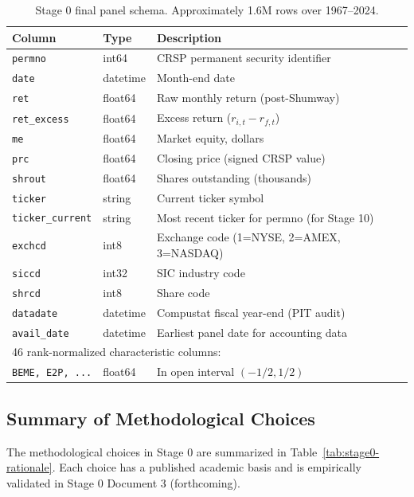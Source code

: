\begin{table}[!ht]
\centering
\small
\begin{tabular}{lll}
\toprule
\textbf{Column} & \textbf{Type} & \textbf{Description} \\
\midrule
\texttt{permno} & int64 & CRSP permanent security identifier \\
\texttt{date} & datetime & Month-end date \\
\texttt{ret} & float64 & Raw monthly return (post-Shumway) \\
\texttt{ret\_excess} & float64 & Excess return ($r_{i,t} - r_{f,t}$) \\
\texttt{me} & float64 & Market equity, dollars \\
\texttt{prc} & float64 & Closing price (signed CRSP value) \\
\texttt{shrout} & float64 & Shares outstanding (thousands) \\
\texttt{ticker} & string & Current ticker symbol \\
\texttt{ticker\_current} & string & Most recent ticker for permno (for Stage 10) \\
\texttt{exchcd} & int8 & Exchange code (1=NYSE, 2=AMEX, 3=NASDAQ) \\
\texttt{siccd} & int32 & SIC industry code \\
\texttt{shrcd} & int8 & Share code \\
\texttt{datadate} & datetime & Compustat fiscal year-end (PIT audit) \\
\texttt{avail\_date} & datetime & Earliest panel date for accounting data \\
\midrule
\multicolumn{3}{l}{46 rank-normalized characteristic columns:} \\
\texttt{BEME, E2P, ...} & float64 & In open interval $(-1/2, 1/2)$ \\
\bottomrule
\end{tabular}
\caption{Stage 0 final panel schema. Approximately 1.6M rows over
1967--2024.}
\label{tab:stage0-schema}
\end{table}

\subsection{Summary of Methodological Choices}
\label{subsec:stage0-rationale-summary}

The methodological choices in Stage 0 are summarized in
Table~\ref{tab:stage0-rationale}. Each choice has a published
academic basis and is empirically validated in Stage 0 Document 3
(forthcoming).

